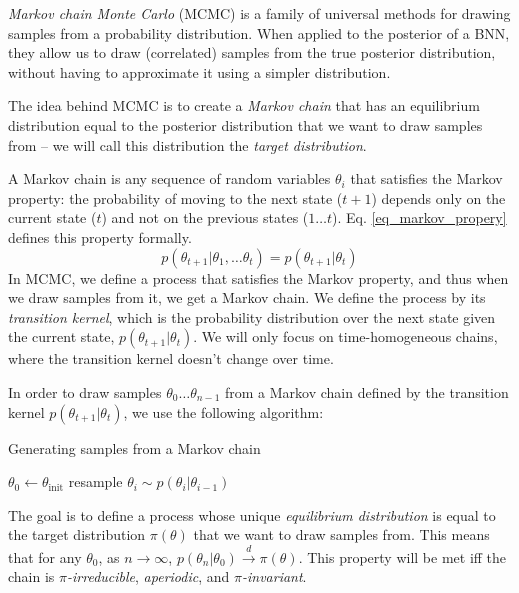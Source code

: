 \documentclass[12pt]{article}
\begin{document}
\textit{Markov chain Monte Carlo} (MCMC) is a family of universal methods for drawing samples from a probability distribution. When applied to the posterior of a BNN, they allow us to draw (correlated) samples from the true posterior distribution, without having to approximate it using a simpler distribution.

The idea behind MCMC is to create a \textit{Markov chain} that has an equilibrium distribution equal to the posterior distribution that we want to draw samples from -- we will call this distribution the \textit{target distribution}.

A Markov chain is any sequence of random variables $\theta_i$ that satisfies the Markov property: the probability of moving to the next state ($t+1$) depends only on the current state ($t$) and not on the previous states ($1 \ldots t$). Eq. \ref{eq_markov_propery} defines this property formally.
\begin{equation}
p(\theta_{t+1}|\theta_1,\ldots \theta_t)=p(\theta_{t+1}|\theta_t)
\label{eq_markov_propery}
\end{equation}
In MCMC, we define a process that satisfies the Markov property, and thus when we draw samples from it, we get a Markov chain. We define the process by its \textit{transition kernel}, which is the probability distribution over the next state given the current state, $p(\theta_{t+1}|\theta_t)$. We will only focus on time-homogeneous chains, where the transition kernel doesn't change over time.

In order to draw samples $\theta_0 \ldots \theta_{n-1}$ from a Markov chain defined by the transition kernel $p(\theta_{t+1}|\theta_t)$, we use the following algorithm:

\begin{algorithm}
\caption{Generating samples from a Markov chain}
\label{alg_mh}
\begin{algorithmic}
\State $\theta_0 \gets \theta_{\textrm{init}}$
	\State resample $\theta_i \sim p(\theta_i|\theta_{i-1})$
\EndFor
\end{algorithmic}
\end{algorithm}

The goal is to define a process whose unique \textit{equilibrium distribution} is equal to the target distribution $\pi(\theta)$ that we want to draw samples from. This means that for any $\theta_0$, as $n \rightarrow \infty$, $p(\theta_n|\theta_0) \xrightarrow{d} \pi(\theta)$. This property will be met iff the chain is \textit{$\pi$-irreducible}, \textit{aperiodic}, and \textit{$\pi$-invariant}.
\end{document}
